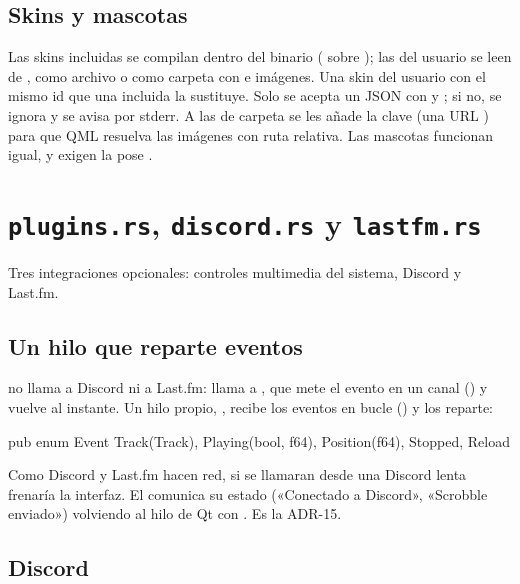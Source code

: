 \subsection{Skins y mascotas}

Las skins incluidas se compilan dentro del binario ( sobre
); las del usuario se leen de , como
archivo  o como carpeta con  e imágenes. Una skin del usuario con
el mismo id que una incluida la sustituye. Solo se acepta un JSON con  y
; si no, se ignora y se avisa por stderr. A las de carpeta se les añade la clave
 (una URL ) para que QML resuelva las imágenes con ruta relativa. Las
mascotas funcionan igual, y exigen la pose .

\section{\texttt{plugins.rs}, \texttt{discord.rs} y \texttt{lastfm.rs}}
\label{sec:plugins}

Tres integraciones opcionales: controles multimedia del sistema, Discord y Last.fm.

\subsection{Un hilo que reparte eventos}

 no llama a Discord ni a Last.fm: llama a , que mete el
evento en un canal () y vuelve al instante. Un hilo propio, ,
recibe los eventos en bucle () y los reparte:

\begin{rust}
pub enum Event { Track(Track), Playing(bool, f64), Position(f64), Stopped, Reload }
\end{rust}

Como Discord y Last.fm hacen red, si se llamaran desde  una Discord lenta frenaría
la interfaz. El  comunica su estado («Conectado a Discord», «Scrobble enviado»)
volviendo al hilo de Qt con . Es la ADR-15.

\subsection{Discord}


